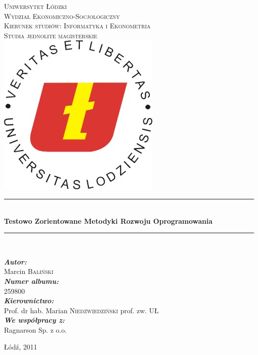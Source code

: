 \begin{titlepage}

\begin{center}
  
\newcommand{\HRule}{\rule{\linewidth}{0.5mm}}

\textsc{\LARGE Uniwersytet Łódzki}\\[0.5cm]

\textsc{\Large Wydział Ekonomiczno-Socjologiczny}\\[0.5cm]

\textsc{\Large Kierunek studiów: Informatyka i Ekonometria}\\[0.5cm]

\textsc{\Large Studia jednolite magisterskie}\\[2cm]

\includegraphics[scale=3.5]{images/ul-logo.jpg}\\[2cm]   



\HRule \\[0.4cm]
{\huge \bfseries Testowo Zorientowane Metodyki Rozwoju Oprogramowania}\\[0.5cm]
\HRule \\[0.4cm]



\begin{minipage}[t]{0.8\textwidth}
\begin{flushleft}
\normalsize{\textbf{\emph{Autor:}}}\\
\large{Marcin \textsc{Baliński}}\\
\normalsize{\textbf{\emph{Numer albumu:}}}\\
\large{\textsc{259800}} \\
\normalsize{\textbf{\emph{Kierownictwo:}}} \\
\large{Prof. dr hab. Marian \textsc{Niedźwiedziński} prof. zw. UŁ} \\[0.5cm]
\normalsize{\textbf{\emph{We współpracy z:}}}\\
\large{Ragnarson Sp. z o.o.}
\end{flushleft}
\end{minipage}

\vfill

{\large Łódź, 2011}

\end{center}

\end{titlepage}
